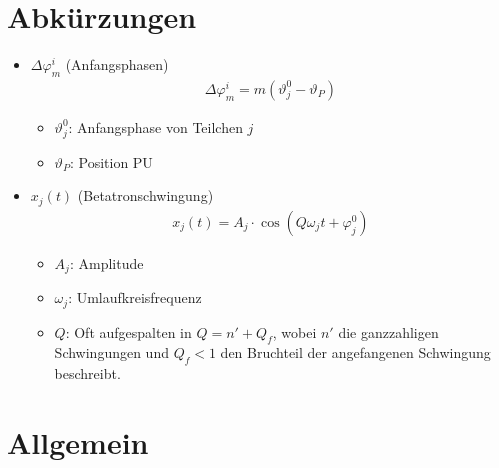 \documentclass[12pt]{article}%
\renewcommand{\phi}{\varphi}
\renewcommand{\theta}{\vartheta}
\begin{document}
\section{Abkürzungen}

\begin{itemize}

\item $\Delta \phi_m^i$ (Anfangsphasen)
\begin{align}
\label{delta_phi}\Delta \phi_m^i = m (\theta_j^0 - \theta_P)
\end{align}
	\begin{itemize}
	
	\item \emph{$\theta_j^0$}: Anfangsphase von Teilchen $j$
	\item \emph{$\theta_P$}: Position PU
	
	\end{itemize}

\item $x_j(t)$ (Betatronschwingung)
\begin{align} \label{eq:betatron_x}
	x_j(t) = A_j \cdot \cos (Q \omega_j t + \phi_j^0)
\end{align}

	\begin{itemize}
	
	\item $A_j$: Amplitude
	\item $\omega_j$: Umlaufkreisfrequenz
	\item $Q$: Oft aufgespalten in $Q = n' + Q_f$, wobei $n'$ die ganzzahligen Schwingungen und $Q_f < 1$ den Bruchteil der angefangenen Schwingung beschreibt.
	
	\end{itemize}

\end{itemize}

\section{Allgemein}	
\end{document}
